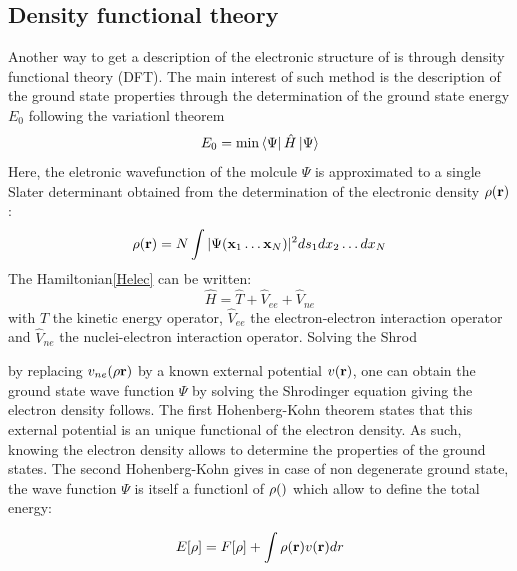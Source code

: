 \documentclass[10pt]{report}
\numberwithin{equation}{section}
\begin{document}
\subsection{Density functional theory}

Another way to get a description of the electronic structure of is through density functional theory (DFT).
The main interest of such method is the description of the ground state properties through the determination of the ground state energy $E_0$ following the variationl theorem
\begin{equation}
    E_0 = \min \bra{\Psi} \hat{H} \ket{\Psi}
\end{equation}
Here, the eletronic wavefunction of the molcule $\Psi$ is approximated to a single Slater determinant obtained from the determination of the electronic density $\rho(\vb r)$:
\begin{equation}
    \rho(\vb r)=N\int |\Psi(\vb x_1 \ldots \vb x_N)|^2 ds_1 dx_2 \ldots dx_N
\end{equation}
The Hamiltonian\ref{Helec} can be written:
\begin{equation}\label{Hop}
    \hat{H}=\hat{T} + \hat{V}_{ee} + \hat{V}_{ne}
\end{equation} 
with $\hat{T}$ the kinetic energy operator, $\hat{V}_{ee}$ the electron-electron interaction operator and $\hat{V}_{ne}$ the nuclei-electron interaction operator. 
Solving the Shrod

by replacing $v_{ne}(\rho\vb r)$ by a known external potential $v(\vb r)$, one can obtain the ground state wave function $\Psi$ by solving the Shrodinger equation giving the electron density follows.
The first Hohenberg-Kohn theorem states that this external potential is an unique functional of the electron density.
As such, knowing the electron density allows to determine the properties of the ground states.
The second Hohenberg-Kohn gives in case of non degenerate ground state, the wave function $\Psi$ is itself a functionl of $\rho(\vb)$ which allow to define the total energy:

\begin{equation}\label{EnergyDFT}
    E[\rho]= F[\rho]+ \int \rho(\vb r) v(\vb r)dr
\end{equation}
\end{document}

